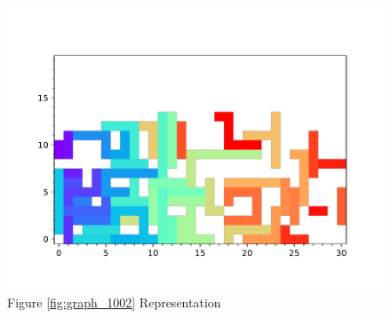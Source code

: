 \documentclass{standalone}
\begin{document}
\begin{figure}[!htb]
	\caption{Figure \ref{fig:graph_1002} Representation}
	\label{fig:picture_1002}
	\includegraphics[width=\textwidth]{../graphs/picture/1002.pdf}
\end{figure}
\end{document}

